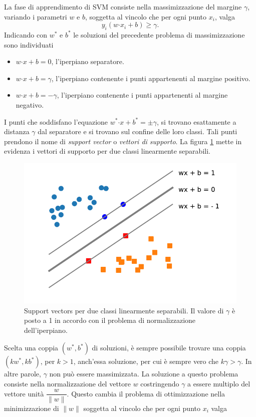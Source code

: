 \documentclass [11pt,a4paper,twoside,openright] {book}
\begin{document}
La fase di apprendimento di SVM consiste nella massimizzazione del margine $\gamma$, variando i parametri $w$ e $b$, soggetta al vincolo che per ogni punto $x_i$, valga
\[
y_i(w\boldsymbol{\cdot}x_i + b) \geq \gamma.
\]
Indicando con $w^*$ e $b^*$ le soluzioni del precedente problema di massimizzazione sono individuati
\begin{itemize}
\item[]$w \boldsymbol{\cdot} x + b = 0$, l'iperpiano separatore.
\item[]$w \boldsymbol{\cdot} x + b = \gamma$, l'iperpiano contenente i punti appartenenti al margine positivo.
\item[]$w \boldsymbol{\cdot} x + b = -\gamma$, l'iperpiano contenente i punti appartenenti al margine negativo.
\end{itemize}
I punti che soddisfano l'equazione $w^* \boldsymbol{\cdot} x + b^* = \pm \gamma$, si trovano esattamente a distanza $\gamma$ dal separatore e si trovano sul confine delle loro classi. Tali punti prendono il nome di \textit{support vector} o \textit{vettori di supporto}. La figura \ref{supportvector} mette in evidenza i vettori di supporto per due classi linearmente separabili.\\
\begin{figure}[!h]
\centering
\includegraphics[scale=.6]{figure/supportvectors.pdf}
\caption{Support vectors per due classi linearmente separabili. Il valore di $\gamma$ è posto a 1 in accordo con il problema di normalizzazione dell'iperpiano. \label{supportvector}}
\end{figure}Scelta una coppia $(w^*, b^*)$ di soluzioni, è sempre possibile trovare una coppia $(kw^*, kb^*)$, per $k>1$, anch'essa soluzione, per cui è sempre vero che $k\gamma > \gamma$. In altre parole, $\gamma$ non può essere massimizzata. La soluzione a questo problema consiste nella normalizzazione del vettore $w$ costringendo $\gamma$ a essere multiplo del vettore unità $\dfrac{w}{\parallel w \parallel}$. Questo cambia il problema di ottimizzazione nella minimizzazione di $\parallel w \parallel$ soggetta al vincolo che per ogni punto $x_i$ valga
\end{document}
